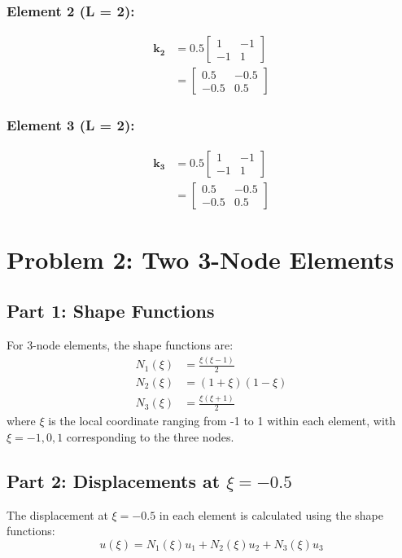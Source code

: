 \documentclass[12pt,a4paper]{article}
\begin{document}
\subsubsection*{Element 2 (L = 2):}
\begin{align}
\mathbf{k_2} &= 0.5 \begin{bmatrix} 1 & -1 \\ -1 & 1 \end{bmatrix} \\
&= \begin{bmatrix} 0.5 & -0.5 \\ -0.5 & 0.5 \end{bmatrix}
\end{align}

\subsubsection*{Element 3 (L = 2):}
\begin{align}
\mathbf{k_3} &= 0.5 \begin{bmatrix} 1 & -1 \\ -1 & 1 \end{bmatrix} \\
&= \begin{bmatrix} 0.5 & -0.5 \\ -0.5 & 0.5 \end{bmatrix}
\end{align}

\section{Problem 2: Two 3-Node Elements}

\subsection{Part 1: Shape Functions}
For 3-node elements, the shape functions are:
\begin{align}
N_1(\xi) &= \frac{\xi(\xi-1)}{2} \\
N_2(\xi) &= (1+\xi)(1-\xi) \\
N_3(\xi) &= \frac{\xi(\xi+1)}{2}
\end{align}
where $\xi$ is the local coordinate ranging from -1 to 1 within each element, with $\xi = -1, 0, 1$ corresponding to the three nodes.

\subsection{Part 2: Displacements at $\xi = -0.5$}
The displacement at $\xi = -0.5$ in each element is calculated using the shape functions:
\begin{equation}
u(\xi) = N_1(\xi)u_1 + N_2(\xi)u_2 + N_3(\xi)u_3
\end{equation}
\end{document}

